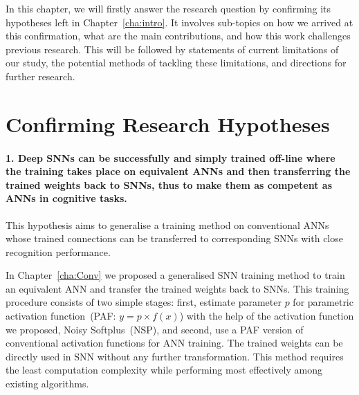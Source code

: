 In this chapter, we will firstly answer the research question by confirming its hypotheses left in Chapter~\ref{cha:intro}.
It involves sub-topics on how we arrived at this confirmation, what are the main contributions, and how this work challenges previous research.
This will be followed by statements of current limitations of our study, the potential methods of tackling these limitations, and directions for further research.



\section{Confirming Research Hypotheses}
\paragraph{1. Deep SNNs can be successfully and simply trained off-line where the training takes place on equivalent ANNs and then transferring the trained weights back to SNNs, thus to make them as competent as ANNs in cognitive tasks.}
This hypothesis aims to generalise a training method on conventional ANNs whose trained connections can be transferred to corresponding SNNs with close recognition performance.

In Chapter~\ref{cha:Conv} we proposed a generalised SNN training method to train an equivalent ANN and transfer the trained weights back to SNNs.
This training procedure consists of two simple stages: first, estimate parameter $p$ for parametric activation function~(PAF: $y = p \times f(x)$) with the help of the activation function we proposed, Noisy Softplus~(NSP), and second, use a PAF version of conventional activation functions for ANN training. %
The trained weights can be directly used in SNN without any further transformation.
This method requires the least computation complexity while performing most effectively among existing algorithms.

